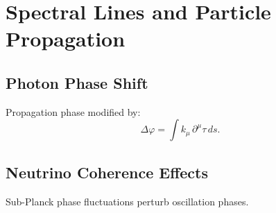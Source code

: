 \chapter{Spectral Lines and Particle Propagation}

\section{Photon Phase Shift}
Propagation phase modified by:
\[
\Delta\varphi=\int k_\mu\,\partial^\mu\tau\,ds.
\]

\section{Neutrino Coherence Effects}
Sub-Planck phase fluctuations perturb oscillation phases.

